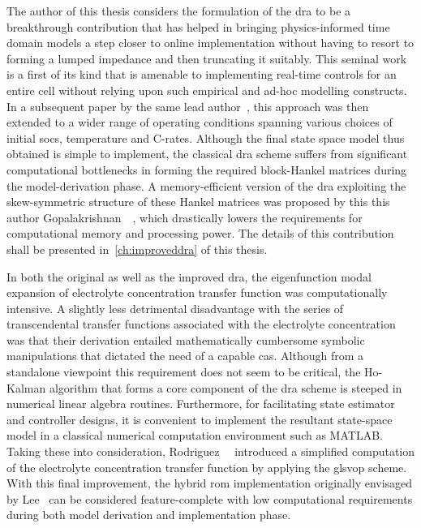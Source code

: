 The author  of this thesis  considers the formulation of  the \gls{dra} to  be a
breakthrough  contribution that  has  helped in  bringing physics-informed  time
domain models a step closer to online implementation without having to resort to
forming a lumped impedance and then truncating it suitably. This seminal work is
a first  of its  kind that  is amenable to  implementing real-time  controls for
an  entire  cell  without  relying  upon such  empirical  and  ad-hoc  modelling
constructs. In a  subsequent paper by the same  lead author~\cite{Lee2014}, this
approach was  then extended to  a wider  range of operating  conditions spanning
various  choices  of  initial  \glspl{soc}, temperature  and  C-rates.  Although
the  final  state  space  model  thus  obtained  is  simple  to  implement,  the
classical \gls{dra} scheme suffers from significant computational bottlenecks in
forming the  required block-Hankel  matrices during the  model-derivation phase.
A  memory-efficient  version  of  the \gls{dra}  exploiting  the  skew-symmetric
structure  of these  Hankel  matrices was  proposed by  this  this author  \ie{}
Gopalakrishnan~\etal{}~\cite{Gopalakrishnan2017},  which drastically  lowers the
requirements for computational memory and  processing power. The details of this
contribution shall be presented in~\cref{ch:improveddra} of this thesis.


In both the original as well  as the improved \gls{dra}, the eigenfunction modal
expansion  of electrolyte  concentration transfer  function was  computationally
intensive.  A  slightly  less  detrimental   disadvantage  with  the  series  of
transcendental transfer functions associated  with the electrolyte concentration
was   that  their   derivation  entailed   mathematically  cumbersome   symbolic
manipulations that  dictated the need  of a  capable \gls{cas}. Although  from a
standalone  viewpoint  this  requirement  does  not seem  to  be  critical,  the
\mbox{Ho-Kalman}  algorithm  that  forms  a  core  component  of  the  \gls{dra}
scheme  is  steeped  in  numerical linear  algebra  routines.  Furthermore,  for
facilitating  state  estimator  and  controller designs,  it  is  convenient  to
implement the resultant  state-space model in a  classical numerical computation
environment   such  as   \textsc{MATLAB}.  Taking   these  into   consideration,
Rodriguez~\etal{}~\cite{Rodriguez2017}  introduced a  simplified computation  of
the  electrolyte  concentration  transfer  function  by  applying  the  gls{vop}
scheme.  With  this  final  improvement,  the  hybrid  \gls{rom}  implementation
originally envisaged by Lee~\etal{} can  be considered feature-complete with low
computational  requirements  during  both model  derivation  and  implementation
phase.


